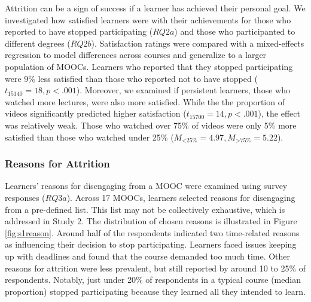 \documentclass{sigchi}\usepackage[]{graphicx}\usepackage[]{color}
\begin{document}
Attrition can be a sign of success if a learner has achieved their personal goal. We investigated how satisfied learners were with their achievements for those who reported to have stopped participating ($RQ2a$) and those who participanted to different degrees ($RQ2b$). Satisfaction ratings were compared with a mixed-effects regression to model differences across courses and generalize to a larger population of MOOCs. Learners who reported that they stopped participating were 9\% less satisfied than those who reported not to have stopped ($t_{15140}=18, p<.001$). Moreover, we examined if persistent learners, those who watched more lectures, were also more satisfied. While the the proportion of videos significantly predicted higher satisfaction ($t_{15700}=14, p<.001$), the effect was relatively weak. Those who watched over 75\% of videos were only 5\% more satisfied than those who watched under 25\% ($M_{<\text{25\%}}=4.97, M_{>\text{75\%}}=5.22$).






\subsubsection{Reasons for Attrition}

Learners' reasons for disengaging from a MOOC were examined using survey responses ($RQ3a$). Across 17 MOOCs, learners selected reasons for disengaging from a pre-defined list. This list may not be collectively exhaustive, which is addressed in Study 2. The distribution of chosen reasons is illustrated in Figure \ref{fig:s1reason}. Around half of the respondents indicated two time-related reasons as influencing their decision to stop participating. Learners faced issues keeping up with deadlines and found that the course demanded too much time. Other reasons for attrition were less prevalent, but still reported by around 10 to 25\% of respondents. Notably, just under 20\% of respondents in a typical course (median proportion) stopped participating because they learned all they intended to learn.
\end{document}

